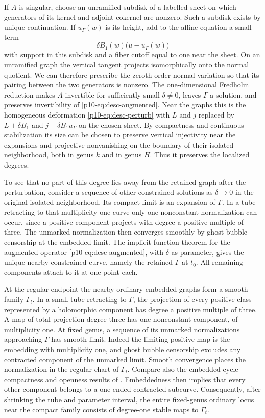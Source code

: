 If $A$ is singular, choose an unramified subdisk of a labelled sheet
on which generators of its kernel and adjoint cokernel are nonzero.
Such a subdisk exists by unique continuation. If $u_\Gamma(w)$
is its height, add to the affine equation a small term
\[
                     \delta B_1(w)\bigl(u-u_\Gamma(w)\bigr)
\]
with support in this subdisk and a fiber cutoff equal to one near
the sheet. On an unramified graph the vertical tangent projects
isomorphically onto the normal quotient. We can therefore prescribe
the zeroth-order normal variation so that its pairing between the
two generators is nonzero. The one-dimensional Fredholm reduction
makes $A$ invertible for sufficiently small $\delta\ne0$, leaves
$\Gamma$ a solution, and preserves invertibility of
\eqref{p10-eq:desc-augmented}. Near the graphs this is the homogeneous
deformation \eqref{p10-eq:desc-perturb} with $L$ and $j$ replaced by
$L+\delta B_1$ and $j+\delta B_1u_\Gamma$ on the chosen sheet.
By compactness and continuous stabilization its size can be chosen
to preserve vertical injectivity near the expansions and projective
nonvanishing on the boundary of their isolated neighborhood, both in
genus $k$ and in genus $H$. Thus it preserves the localized degrees.

To see that no part of this degree lies away from the retained graph
after the perturbation, consider a sequence of other constrained
solutions as $\delta\to0$ in the original isolated neighborhood.
Its compact limit is an expansion of $\Gamma$. In a tube retracting
to that multiplicity-one curve only one nonconstant normalization
can occur, since a positive component projects with degree a
positive multiple of three. The unmarked normalization then converges
smoothly by ghost bubble censorship at the embedded limit. The
implicit function theorem for the augmented operator
\eqref{p10-eq:desc-augmented}, with $\delta$ as parameter, gives the
unique nearby constrained curve, namely the retained $\Gamma$
at $t_0$. All remaining components attach to it at one point each.

At the regular endpoint the nearby ordinary embedded graphs form
a smooth family $\Gamma_t$. In a small tube retracting to
$\Gamma$, the projection of every positive class represented by a
holomorphic component has degree a positive multiple of three.
A map of total projection degree three has one nonconstant component,
of multiplicity one. At fixed genus, a sequence of its unmarked
normalizations approaching $\Gamma$ has smooth limit. Indeed the
limiting positive map is the embedding with multiplicity one, and
ghost bubble censorship excludes any contracted component of the
unmarked limit. Smooth convergence places the normalization in the
regular chart of $\Gamma_t$.
Compare also the embedded-cycle compactness and openness results
of \cite[Propositions~2.21 and~2.29]{diw}. Embeddedness then implies
that every other component belongs to a one-ended contracted subcurve.
Consequently, after shrinking the tube and parameter interval, the
entire fixed-genus ordinary locus near the compact family consists of
degree-one stable maps to $\Gamma_t$.


